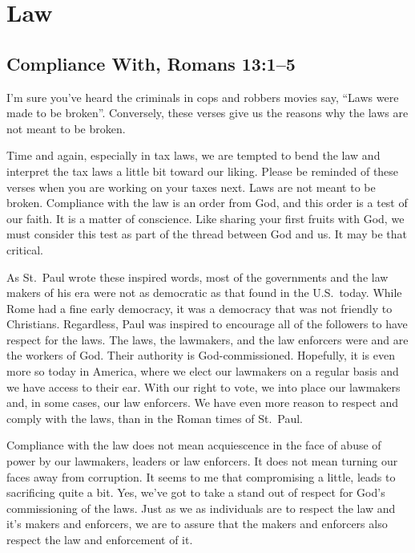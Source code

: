 \documentclass[12pt]{memoir}
\begin{document}
\section{Law}

\subsection[Compliance With]{Compliance With, Romans 13:1--5}

I'm sure you've heard the criminals in cops and robbers movies
say, ``Laws were made to be broken''. Conversely, these verses give
us the reasons why the laws are not meant to be broken.

Time and again, especially in tax laws, we are tempted to bend
the law and interpret the tax laws a little bit toward our liking.
Please be reminded of these verses when you are working on your taxes
next. Laws are not meant to be broken. Compliance with the law is
an order from God, and this order is a test of our faith. It is a
matter of conscience. Like sharing your first fruits with God,
we must consider this test as part of the thread between God and
us. It may be that critical.

As St.~Paul wrote these inspired words, most of the governments and
the law makers of his era were not as democratic as that found in
the U.S.\ today. While Rome had a fine early democracy, it was a democracy
that was not friendly to Christians.
Regardless, Paul was inspired
to encourage all of the followers to have respect for the laws. The
laws, the lawmakers, and the law enforcers were and are the workers
of God. Their authority is God-commissioned. Hopefully, it is even
more so today in America, where we elect our lawmakers on a regular basis and we have access to their ear. With our right to vote, we
into place our lawmakers and, in some cases, our law enforcers. We have even more reason to respect and comply with the laws, than in the
Roman times of St.~Paul.

Compliance with the law does not mean acquiescence in the face of
abuse of power by our lawmakers, leaders or law enforcers. It does
not mean turning our faces away from corruption. It seems to me that compromising a little, leads to sacrificing quite a bit. Yes, we've got to take
a stand out of respect for God's commissioning of the laws. Just as
we as individuals are to respect the law and it's makers and enforcers,
we are to assure that the makers and enforcers also respect the law
and enforcement of it. 
\end{document}
